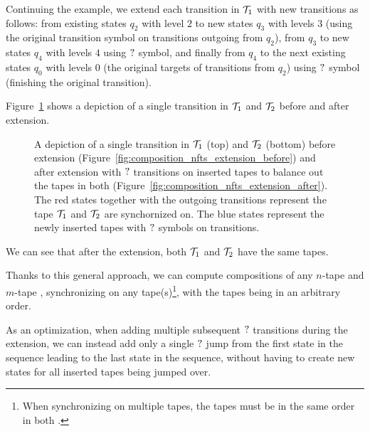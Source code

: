 \begin{example}
  Continuing the example, we extend each \nft transition in $\mathcal{T}_1$ with new transitions as follows: from existing states $q_2$ with level $2$ to new states $q_3$ with levels $3$ (using the original transition symbol on transitions outgoing from $q_2$), from $q_3$ to new states $q_4$ with levels $4$ using $?$ symbol, and finally from $q_4$ to the next existing states $q_0$ with levels $0$ (the original targets of transitions from $q_2$) using $?$ symbol (finishing the original \nft transition).

  Figure~\ref{fig:composition_nfts_extension} shows a depiction of a single transition in $\mathcal{T}_1$ and $\mathcal{T}_2$ before and after extension.

  \begin{figure}[ht]
    \centering
    \qquad
    \caption{
      A depiction of a single transition in \nfts $\mathcal{T}_1$ (top) and $\mathcal{T}_2$ (bottom) before extension (Figure~\ref{fig:composition_nfts_extension_before}) and after extension with $?$ transitions on inserted tapes to balance out the tapes in both \nfts (Figure~\ref{fig:composition_nfts_extension_after}).
      The red states together with the outgoing transitions represent the tape $\mathcal{T}_1$ and $\mathcal{T}_2$ are synchornized on.
      The blue states represent the newly inserted tapes with $?$ symbols on transitions.
    }
    \label{fig:composition_nfts_extension}%
  \end{figure}

  We can see that after the extension, both $\mathcal{T}_1$ and $\mathcal{T}_2$ have the same tapes.
\end{example}

Thanks to this general approach, we can compute compositions of any $n$-tape and $m$-tape \nfts, synchronizing on any tape(s)\footnote{When synchronizing on multiple tapes, the tapes must be in the same order in both \nfts.}, with the tapes being in an arbitrary order.

As an optimization, when adding multiple subsequent $?$ transitions during the extension, we can instead add only a single $?$ jump from the first state in the sequence leading to the last state in the sequence, without having to create new states for all inserted tapes being jumped over.

